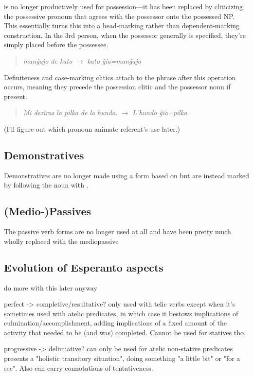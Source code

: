  is no longer productively used for possession---it has been replaced by cliticizing the possessive pronoun that agrees with the possessor onto the possessed NP. This essentially turns this into a head-marking rather than dependent-marking construction. In the 3rd person, when the possessor generally is specified, they're simply placed before the possessee.
\begin{quote}
    \textit{manĝaĵo de kato} $\to$ \textit{kato ĝia=manĝaĵo}
\end{quote}
Definiteness and case-marking clitics attach to the phrase after this operation occurs, meaning they precede the possession clitic and the possessor noun if present.
\begin{quote}
    \textit{Mi deziras la pilko de la hundo.} $\to$ \textit{L'hundo ĝia=pilko}
\end{quote}
(I'll figure out which pronoun animate referent's use later.)

\subsection{Demonstratives}

Demonstratives are no longer made using a form based on  but are instead marked by following the noun with .

\subsection{(Medio-)Passives}

The passive verb forms are no longer used at all and have been pretty much wholly replaced with the mediopassive 

\subsection{Evolution of Esperanto aspects}

do more with this later anyway

perfect -> completive/resultative?
only used with telic verbs except when it's sometimes used with atelic predicates, in which case it bestows implications of culmination/accomplishment, adding implications of a fixed amount of the activity that needed to be (and was) completed. Cannot be used for statives tho.

progressive -> delimiative?
can only be used for atelic non-stative predicates
presents a "holistic transitory situation", doing something "a little bit" or "for a sec". Also can carry connotations of tentativeness.

